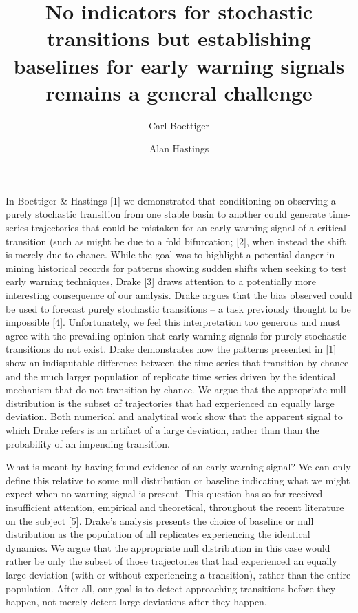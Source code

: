 \documentclass[review]{elsarticle} %
\begin{document}
\begin{frontmatter}
  \title{No indicators for stochastic transitions but establishing baselines for
         early warning signals remains a general challenge}
  \author[cstar]{Carl Boettiger}
  \address[cstar]{Center for Stock Assessment Research, Department of Applied Math and Statistics, University of California, Mail Stop SOE-2, Santa Cruz, CA 95064, USA}
  \author[esp]{Alan Hastings}
  \address[esp]{Department of Environmental Science and Policy, University of California, Davis, CA, 95616 United States}
 \end{frontmatter}


In Boettiger \& Hastings {[}1{]} we demonstrated that conditioning on
observing a purely stochastic transition from one stable basin to
another could generate time-series trajectories that could be mistaken
for an early warning signal of a critical transition (such as might be
due to a fold bifurcation; {[}2{]}, when instead the shift is merely due
to chance. While the goal was to highlight a potential danger in mining
historical records for patterns showing sudden shifts when seeking to
test early warning techniques, Drake {[}3{]} draws attention to a
potentially more interesting consequence of our analysis. Drake argues
that the bias observed could be used to forecast purely stochastic
transitions -- a task previously thought to be impossible {[}4{]}.
Unfortunately, we feel this interpretation too generous and must agree
with the prevailing opinion that early warning signals for purely
stochastic transitions do not exist. Drake demonstrates how the patterns
presented in {[}1{]} show an indisputable difference between the time
series that transition by chance and the much larger population of
replicate time series driven by the identical mechanism that do not
transition by chance. We argue that the appropriate null distribution is
the subset of trajectories that had experienced an equally large
deviation. Both numerical and analytical work show that the apparent
signal to which Drake refers is an artifact of a large deviation, rather
than than the probability of an impending transition.

What is meant by having found evidence of an early warning signal? We
can only define this relative to some null distribution or baseline
indicating what we might expect when no warning signal is present. This
question has so far received insufficient attention, empirical and
theoretical, throughout the recent literature on the subject {[}5{]}.
Drake's analysis presents the choice of baseline or null distribution as
the population of all replicates experiencing the identical dynamics. We
argue that the appropriate null distribution in this case would rather
be only the subset of those trajectories that had experienced an equally
large deviation (with or without experiencing a transition), rather than
the entire population. After all, our goal is to detect approaching
transitions before they happen, not merely detect large deviations after
they happen.
\end{document}
